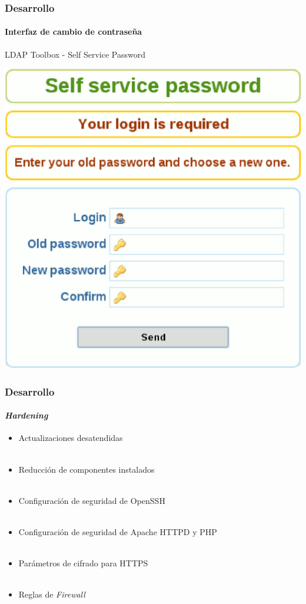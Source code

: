 \documentclass{beamer}
\begin{document}
\begin{frame}
\frametitle{Desarrollo}
\framesubtitle{Interfaz de cambio de contrase\~{n}a}

LDAP Toolbox - Self Service Password

\vspace{1em}

\centering
\includegraphics[scale=0.4,keepaspectratio=true]{figures/Self-Service-Password}

\end{frame}


\begin{frame}
\frametitle{Desarrollo}
\framesubtitle{\textsl{Hardening}}
\justifying
\begin{itemize}
 \item Actualizaciones desatendidas
\\~\\
 \item Reducci\'{o}n de componentes instalados
\\~\\
 \item Configuraci\'{o}n de seguridad de \textup{OpenSSH}
\\~\\
 \item Configuraci\'{o}n de seguridad de Apache \textup{HTTPD} y \textup{PHP}
\\~\\
 \item Par\'{a}metros de cifrado para \textup{HTTPS}
\\~\\
 \item Reglas de \textsl{Firewall}
\end{itemize}

\end{frame}
\end{document}
